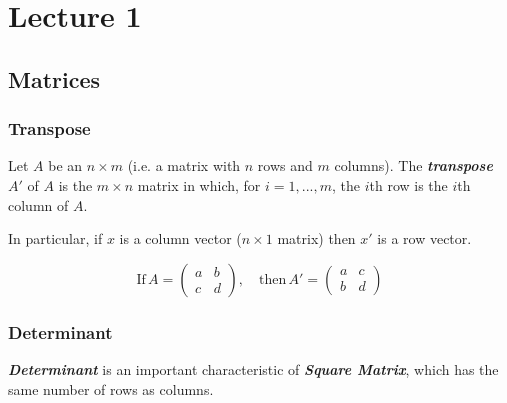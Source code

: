 \section[Pre-requirements]{Lecture 1}

\subsection{Matrices}

\subsubsection{Transpose}

\begin{definition}[Transpose]
	Let $A$ be an $n \times m$ (i.e. a matrix with $n$ rows and $m$ columns). The \textit{\textbf{transpose}} $A'$ of $A$ is the $m \times n$ matrix in which, for $i = 1, ..., m$, the $i$th row is the $i$th column of $A$.
\end{definition}


In particular, if $x$ is a column vector ($n \times 1$ matrix) then $x'$ is a row vector.

\begin{example}
	\begin{equation*}
		\text{If}\, A = \begin{pmatrix}
			a & b \\
			c & d
		\end{pmatrix},\quad \text{then}\, A' = \begin{pmatrix}
			a & c \\
			b & d
		\end{pmatrix}
	\end{equation*}
\end{example}

\subsubsection{Determinant}


\textit{\textbf{Determinant}} is an important characteristic of \textit{\textbf{Square Matrix}}, which has the same number of rows as columns.

